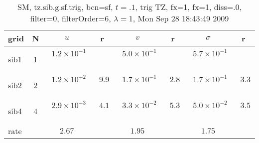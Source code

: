 \begin{table}[hbt]\tableFont %
\begin{center}
\begin{tabular}{|l|c|c|c|c|c|c|c|} \hline 
grid  & N &  $u$  & r &  $v$  & r &  $\sigma$   & r \\ \hline 
                sib1 &     1 & ~$1.2\times10^{ -1}$~ &           & ~$5.0\times10^{ -1}$~ &           & ~$5.7\times10^{ -1}$~ &            \\ \hline
                sib2 &     2 & ~$1.2\times10^{ -2}$~ & ~$  9.9$~ & ~$1.7\times10^{ -1}$~ & ~$  2.8$~ & ~$1.7\times10^{ -1}$~ & ~$  3.3$~  \\ \hline
                sib4 &     4 & ~$2.9\times10^{ -3}$~ & ~$  4.1$~ & ~$3.3\times10^{ -2}$~ & ~$  5.3$~ & ~$5.0\times10^{ -2}$~ & ~$  3.5$~  \\ \hline
    rate             &       &       $2.67$         &       &       $1.95$         &       &       $1.75$         &        \\ \hline
\end{tabular}
\caption{SM, tz.sib.g.sf.trig, bcn=sf, $t=.1$, trig TZ, fx=1, fx=1, diss=.0, filter=0, filterOrder=6, $\lambda=1$, Mon Sep 28 18:43:49 2009}\label{table:tz.sib.g.sf.trig}
\end{center}
\end{table}
